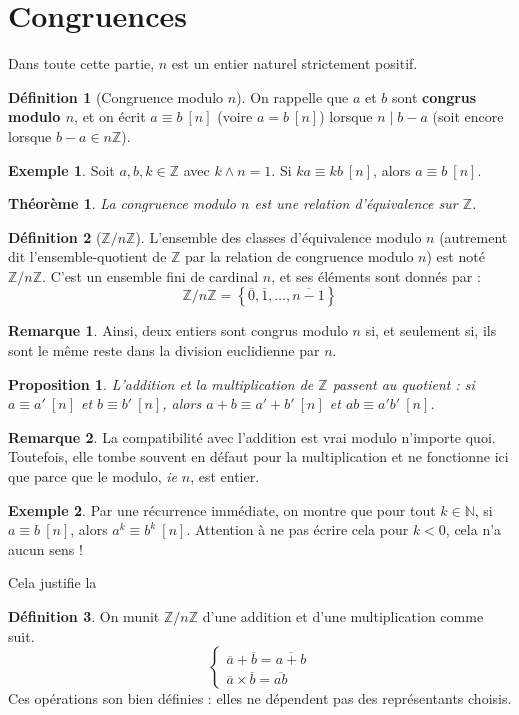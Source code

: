 \documentclass[french]{book}
\newcommand{\N}{\mathbb{N}}
\newcommand{\Z}{\mathbb{Z}}
\theoremstyle{plain}
\newtheorem{thm}{Théorème}[chapter]
\newtheorem{prop}{Proposition}[chapter]
\theoremstyle{definition}
\newtheorem{dfn}{Définition}[chapter]
\newtheorem{exa}{Exemple}[chapter]
\newtheorem{rmq}{Remarque}[chapter]
\theoremstyle{remark}
\begin{document}
\section{Congruences}
Dans toute cette partie, $n$ est un entier naturel strictement positif.
\begin{dfn}[Congruence modulo $n$]
	On rappelle que $a$ et $b$ sont \textbf{congrus modulo $n$}, et on écrit $a\equiv b \ [n]$ (voire $a=b \ [n]$) lorsque $n\mid b-a$ (soit encore lorsque $b-a\in n\Z$).
\end{dfn}
\begin{exa}
	Soit $a,b,k\in\Z$ avec $k\wedge n=1$. Si  $ka\equiv kb\ [n]$, alors $a\equiv b\ [n]$.
\end{exa}
\begin{thm}
	La congruence modulo $n$ est une relation d'équivalence sur $\Z$.
\end{thm}
\begin{dfn}[$\Z/n\Z$]
	L'ensemble des classes d'équivalence modulo $n$ (autrement dit l'ensemble-quotient de $\Z$ par la relation de congruence modulo $n$) est noté $\Z/n\Z$. C'est un ensemble fini de cardinal $n$, et ses éléments sont donnés par : $$\Z/n\Z=\left\{\overline{0},\overline{1},\ldots,\overline{n-1}\right\}$$
\end{dfn}
\begin{rmq}
	Ainsi, deux entiers sont congrus modulo $n$ si, et seulement si, ils sont le même reste dans la division euclidienne par $n$.
\end{rmq}
\begin{prop}
	L'addition et la multiplication de $\Z$ passent au quotient : si $a\equiv a'\ [n]$ et $b\equiv b'\ [n]$, alors $a+b\equiv a'+b'\ [n]$ et $ab\equiv a'b'\ [n]$.
\end{prop}
\begin{rmq}
	La compatibilité avec l'addition est vrai modulo n'importe quoi. Toutefois, elle tombe souvent en défaut pour la multiplication et ne fonctionne ici que parce que le modulo, \textit{ie} $n$, est entier.
\end{rmq}
\begin{exa}
	Par une récurrence immédiate, on montre que pour tout $k\in\N$, si $a\equiv b\ [n]$, alors $a^k\equiv b^k\ [n]$. Attention à ne pas écrire cela pour $k<0$, cela n'a aucun sens !
\end{exa}
Cela justifie la
\begin{dfn}
	On munit $\Z/n\Z$ d'une addition et d'une multiplication comme suit. $$\left \{\begin{array}{ll}\overline{a}+\overline{b}=\overline{a+b}\\ \overline{a}\times\overline{b}=\overline{ab}\end{array}\right.$$ Ces opérations son bien définies : elles ne dépendent pas des représentants choisis.
\end{dfn}
\end{document}
